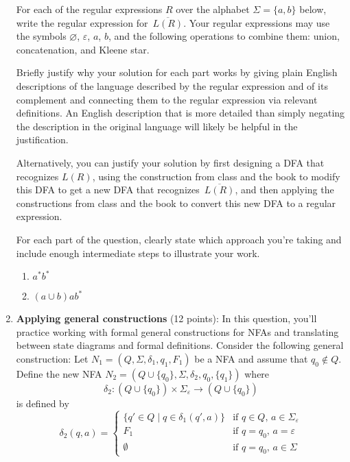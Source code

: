 \begin{enumerate}[wide, labelwidth=!, labelindent=0pt]
For each of the regular expressions $R$ over the alphabet $\Sigma = \{a,b\}$ below, write the regular 
expression for~$\overline{L(R)}$. Your regular expressions may use the symbols
$\varnothing$, $\varepsilon$, $a$, $b$, and the 
following operations to combine them: union, concatenation, 
and Kleene star.

Briefly justify why your solution for each part works by giving plain English descriptions of the language 
described by the regular expression and of its complement and connecting them to the regular 
expression via relevant definitions. An English description that is more 
detailed than simply negating the description in the original language will likely be helpful in the justification.

Alternatively, you can justify your solution by first designing a DFA that recognizes $L(R)$, 
using the construction from class and the book to modify this DFA to get a new DFA that recognizes~$\overline{L(R)}$, 
and then applying the constructions from class and the book to convert this new DFA to a regular expression.

For each part of the question, clearly state which approach you're taking and include enough intermediate
steps to illustrate your work.


\begin{enumerate}
    \item\gradeCorrect $a^*b^*$
    \item\gradeCorrect $(a \cup b) a b^*$
\end{enumerate}


\item\textbf{Applying general constructions} (12 points):
In this question, you'll practice working with formal general constructions
for NFAs and translating between state diagrams and formal definitions.
Consider the following general construction: Let $N_1 = (Q, \Sigma, \delta_1, q_1, F_1)$ be a NFA
and assume that $q_0 \notin Q$.
Define the new NFA $N_2 = (Q \cup \{q_0\}, \Sigma, \delta_2, q_0, \{q_1\})$ where 
$$\delta_2: (Q \cup \{q_0\}) \times \Sigma_\varepsilon \to (Q \cup \{q_0\})$$ is defined by
\[
    \delta_2 (q,a) = \begin{cases}
        \{ q' \in Q \mid q \in \delta_1(q',a)\} &\text{if $q \in Q$, $a \in \Sigma_{\varepsilon}$} \\
        F_1 &\text{if $q =q_0$, $a = \varepsilon$}\\
        \emptyset &\text{if $q = q_0$, $a \in \Sigma$}
    \end{cases}
\]


\end{enumerate}
